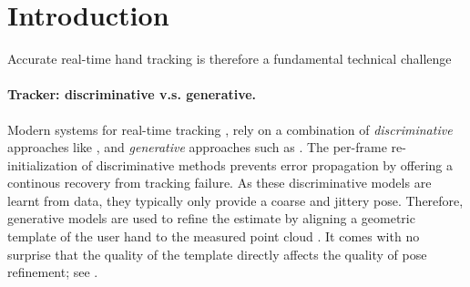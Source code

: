 % 
% 
% 
% 
\section{Introduction}

Accurate real-time hand tracking is therefore a fundamental technical challenge 


\paragraph{Tracker: discriminative v.s. generative.}
Modern systems for real-time tracking \cite{sridhar2015fast,sharp2015accurate},  rely on a combination of \emph{discriminative} approaches like \cite{oberweger2015feedback}, and \emph{generative} approaches such as \cite{tagliasacchi2015robust}. The per-frame re-initialization of discriminative methods prevents error propagation by offering a continous recovery from tracking failure. As these discriminative models are learnt from data, they typically only provide a coarse and jittery pose. Therefore, generative models are used to refine the estimate by aligning a geometric template of the user hand to the measured point cloud . It comes with no surprise that the quality of the template directly affects the quality of pose refinement; see . 

